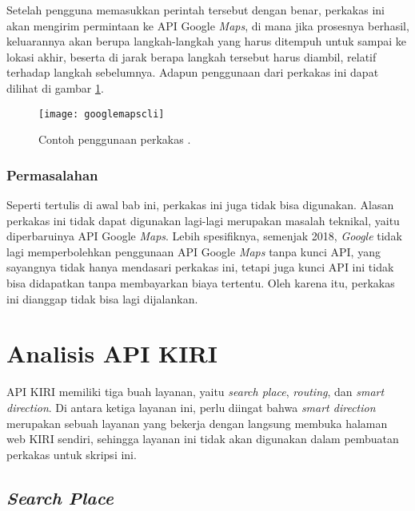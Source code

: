 Setelah pengguna memasukkan perintah tersebut dengan benar, perkakas ini akan mengirim permintaan ke API Google \textit{Maps}, di mana jika prosesnya berhasil, keluarannya akan berupa langkah-langkah yang harus ditempuh untuk sampai ke lokasi akhir, beserta di jarak berapa langkah tersebut harus diambil, relatif terhadap langkah sebelumnya. Adapun penggunaan dari perkakas ini dapat dilihat di gambar \ref{fig:similarapps-googlemapscli}.

\begin{figure}[ht]
    \centering
    \texttt{[image: googlemapscli]}
    \caption[Contoh penggunaan perkakas \googlemapscli]{Contoh penggunaan perkakas \googlemapscli.\protect\footnotemark}
    \label{fig:similarapps-googlemapscli}
\end{figure}

\subsubsection{Permasalahan}
\label{sec:similarapps-googlemapscli-problem}

Seperti tertulis di awal bab ini, perkakas ini juga tidak bisa digunakan. Alasan perkakas ini tidak dapat digunakan lagi-lagi merupakan masalah teknikal, yaitu diperbaruinya API Google \textit{Maps}. Lebih spesifiknya, semenjak 2018, \textit{Google} tidak lagi memperbolehkan penggunaan API Google \textit{Maps} tanpa kunci API, yang sayangnya tidak hanya mendasari perkakas ini, tetapi juga kunci API ini tidak bisa didapatkan tanpa membayarkan biaya tertentu. Oleh karena itu, perkakas ini dianggap tidak bisa lagi dijalankan.

\section{Analisis API KIRI}
\label{sec:analysis-kiri}

API KIRI memiliki tiga buah layanan, yaitu \textit{search place}, \textit{routing}, dan \textit{smart direction}. Di antara ketiga layanan ini, perlu diingat bahwa \textit{smart direction} merupakan sebuah layanan yang bekerja dengan langsung membuka halaman web KIRI sendiri, sehingga layanan ini tidak akan digunakan dalam pembuatan perkakas \cl untuk skripsi ini.

\subsection{\textit{Search Place}}
\label{sec:analysis-kiri-searchplace}

